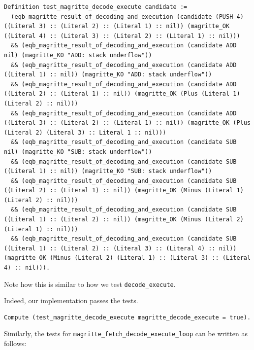 \documentclass{article}
\begin{document}
\begin{lstlisting}
Definition test_magritte_decode_execute candidate :=
  (eqb_magritte_result_of_decoding_and_execution (candidate (PUSH 4) ((Literal 3) :: (Literal 2) :: (Literal 1) :: nil)) (magritte_OK ((Literal 4) :: (Literal 3) :: (Literal 2) :: (Literal 1) :: nil)))
  && (eqb_magritte_result_of_decoding_and_execution (candidate ADD nil) (magritte_KO "ADD: stack underflow"))
  && (eqb_magritte_result_of_decoding_and_execution (candidate ADD ((Literal 1) :: nil)) (magritte_KO "ADD: stack underflow"))
  && (eqb_magritte_result_of_decoding_and_execution (candidate ADD ((Literal 2) :: (Literal 1) :: nil)) (magritte_OK (Plus (Literal 1) (Literal 2) :: nil)))
  && (eqb_magritte_result_of_decoding_and_execution (candidate ADD ((Literal 3) :: (Literal 2) :: (Literal 1) :: nil)) (magritte_OK (Plus (Literal 2) (Literal 3) :: Literal 1 :: nil)))
  && (eqb_magritte_result_of_decoding_and_execution (candidate SUB nil) (magritte_KO "SUB: stack underflow"))
  && (eqb_magritte_result_of_decoding_and_execution (candidate SUB ((Literal 1) :: nil)) (magritte_KO "SUB: stack underflow"))
  && (eqb_magritte_result_of_decoding_and_execution (candidate SUB ((Literal 2) :: (Literal 1) :: nil)) (magritte_OK (Minus (Literal 1) (Literal 2) :: nil)))
  && (eqb_magritte_result_of_decoding_and_execution (candidate SUB ((Literal 1) :: (Literal 2) :: nil)) (magritte_OK (Minus (Literal 2) (Literal 1) :: nil)))
  && (eqb_magritte_result_of_decoding_and_execution (candidate SUB ((Literal 1) :: (Literal 2) :: (Literal 3) :: (Literal 4) :: nil)) (magritte_OK (Minus (Literal 2) (Literal 1) :: (Literal 3) :: (Literal 4) :: nil))).
\end{lstlisting}

Note how this is similar to how we test \texttt{decode\_execute}.

Indeed, our implementation passes the tests.

\begin{lstlisting}
Compute (test_magritte_decode_execute magritte_decode_execute = true).
\end{lstlisting}

Similarly, the tests for \texttt{magritte\_fetch\_decode\_execute\_loop} can be written as follows:
\end{document}
